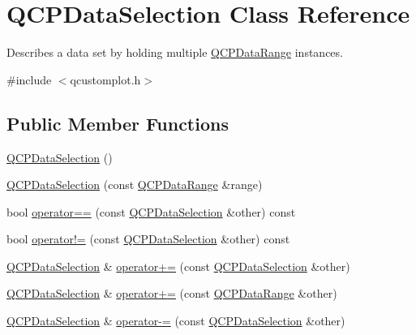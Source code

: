 \hypertarget{class_q_c_p_data_selection}{}\section{Q\+C\+P\+Data\+Selection Class Reference}
\label{class_q_c_p_data_selection}


Describes a data set by holding multiple \mbox{\hyperlink{class_q_c_p_data_range}{Q\+C\+P\+Data\+Range}} instances.  




{\ttfamily \#include $<$qcustomplot.\+h$>$}

\subsection*{Public Member Functions}
\begin{DoxyCompactItemize}
\item 
\mbox{\hyperlink{class_q_c_p_data_selection_a0e0b7faaec7df1a7c77dd6f4883cdf0d}{Q\+C\+P\+Data\+Selection}} ()
\item 
\mbox{\hyperlink{class_q_c_p_data_selection_a738dfb4f5718c5df5ed35ea33ac37818}{Q\+C\+P\+Data\+Selection}} (const \mbox{\hyperlink{class_q_c_p_data_range}{Q\+C\+P\+Data\+Range}} \&range)
\item 
bool \mbox{\hyperlink{class_q_c_p_data_selection_a664fa566569b17148abafd6b1dbbf347}{operator==}} (const \mbox{\hyperlink{class_q_c_p_data_selection}{Q\+C\+P\+Data\+Selection}} \&other) const
\item 
bool \mbox{\hyperlink{class_q_c_p_data_selection_a8324733cc88660ee4792ee60d6a4520c}{operator!=}} (const \mbox{\hyperlink{class_q_c_p_data_selection}{Q\+C\+P\+Data\+Selection}} \&other) const
\item 
\mbox{\hyperlink{class_q_c_p_data_selection}{Q\+C\+P\+Data\+Selection}} \& \mbox{\hyperlink{class_q_c_p_data_selection_a4584d4b0ea5c4f095bd7b70f88eb5d9d}{operator+=}} (const \mbox{\hyperlink{class_q_c_p_data_selection}{Q\+C\+P\+Data\+Selection}} \&other)
\item 
\mbox{\hyperlink{class_q_c_p_data_selection}{Q\+C\+P\+Data\+Selection}} \& \mbox{\hyperlink{class_q_c_p_data_selection_a17058640d4e6f49984a0e7e42043df1b}{operator+=}} (const \mbox{\hyperlink{class_q_c_p_data_range}{Q\+C\+P\+Data\+Range}} \&other)
\item 
\mbox{\hyperlink{class_q_c_p_data_selection}{Q\+C\+P\+Data\+Selection}} \& \mbox{\hyperlink{class_q_c_p_data_selection_a66f9fab70b026baa64bf8e52fe5de07e}{operator-\/=}} (const \mbox{\hyperlink{class_q_c_p_data_selection}{Q\+C\+P\+Data\+Selection}} \&other)

\end{DoxyCompactItemize}
